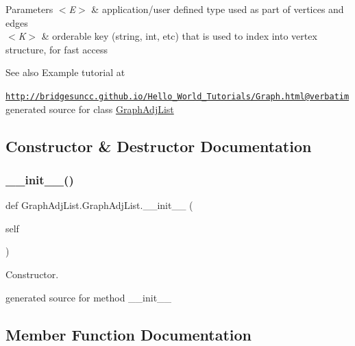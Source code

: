 \begin{DoxyParams}{Parameters}
{\em $<$\+E$>$} & application/user defined type used as part of vertices and edges \\
\hline
{\em $<$\+K$>$} & orderable key (string, int, etc) that is used to index into vertex structure, for fast access\\
\hline
\end{DoxyParams}
\begin{DoxySeeAlso}{See also}
Example tutorial at 
\end{DoxySeeAlso}
\href{http://bridgesuncc.github.io/Hello_World_Tutorials/Graph.html@verbatim}{\tt http\+://bridgesuncc.\+github.\+io/\+Hello\+\_\+\+World\+\_\+\+Tutorials/\+Graph.\+html@verbatim} generated source for class \hyperlink{class_graph_adj_list_1_1_graph_adj_list}{Graph\+Adj\+List}  

\subsection{Constructor \& Destructor Documentation}
\hypertarget{class_graph_adj_list_1_1_graph_adj_list_a045be8de7a7695b8eac07feb9011b73d}{}\label{class_graph_adj_list_1_1_graph_adj_list_a045be8de7a7695b8eac07feb9011b73d} 
\subsubsection{\texorpdfstring{\+\_\+\+\_\+init\+\_\+\+\_\+()}{\_\_init\_\_()}}
{\footnotesize\ttfamily def Graph\+Adj\+List.\+Graph\+Adj\+List.\+\_\+\+\_\+init\+\_\+\+\_\+ (\begin{DoxyParamCaption}\item[{}]{self }\end{DoxyParamCaption})}



Constructor. 

\begin{DoxyVerb}generated source for method __init__ \end{DoxyVerb}
 

\subsection{Member Function Documentation}
\hypertarget{class_graph_adj_list_1_1_graph_adj_list_a52d80ff8e432cabad99cc77feb82a295}{}\label{class_graph_adj_list_1_1_graph_adj_list_a52d80ff8e432cabad99cc77feb82a295} 
